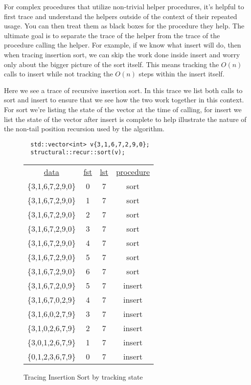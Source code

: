 \documentclass[10pt]{article}
\begin{document}
For complex procedures that utilize non-trivial helper procedures, it's helpful to first trace and understand the helpers outside of the context of their repeated usage. You can then treat them as black boxes for the procedure they help. The ultimate goal is to separate the trace of the helper from the trace of the procedure calling the helper. For example, if we know what insert will do, then when tracing insertion sort, we can skip the work done inside insert and worry only about the bigger picture of the sort itself. This means tracking the $O(n)$ calls to insert while not tracking the $O(n)$ steps within the insert itself.

\newpage \thispagestyle{empty}


Here we see a trace of recursive insertion sort. In this trace we list both calls
to sort and insert to ensure that we see how the two work together in this context.
For sort we're listing the state of the vector at the time of calling, for insert we list
the state of the vector after insert is complete to help illustrate the nature of the non-tail position recursion used by the algorithm.

\begin{figure}[!htbp]

\begin{lstlisting}
  std::vector<int> v{3,1,6,7,2,9,0};
  structural::recur::sort(v);
\end{lstlisting}

\begin{tabular}{cccc}
\underline{data} & \underline{fst} & \underline{lst} & \underline{procedure}\\
 \{3,1,6,7,2,9,0\} & 0 & 7 & sort \\
 \{3,1,6,7,2,9,0\} & 1 & 7 & sort \\
 \{3,1,6,7,2,9,0\} & 2 & 7 & sort \\
 \{3,1,6,7,2,9,0\} & 3 & 7 & sort \\
 \{3,1,6,7,2,9,0\} & 4 & 7 & sort \\
 \{3,1,6,7,2,9,0\} & 5 & 7 & sort \\
 \{3,1,6,7,2,9,0\} & 6 & 7 & sort \\
 \{3,1,6,7,2,0,9\} & 5 & 7 & insert \\
 \{3,1,6,7,0,2,9\} & 4 & 7 & insert \\
 \{3,1,6,0,2,7,9\} & 3 & 7 & insert \\
 \{3,1,0,2,6,7,9\} & 2 & 7 & insert \\
 \{3,0,1,2,6,7,9\} & 1 & 7 & insert \\
 \{0,1,2,3,6,7,9\} & 0 & 7 & insert
\end{tabular}
\caption{Tracing Insertion Sort by tracking state}
\end{figure}
\end{document}
